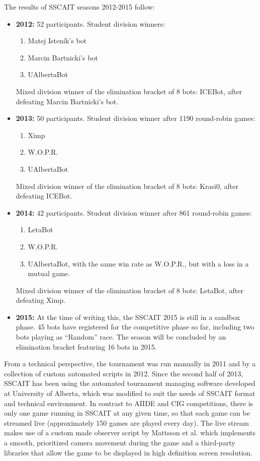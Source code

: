 \documentclass{llncs}
\begin{document}
The results of SSCAIT seasons 2012-2015 follow:
\begin{itemize}
  \item {\bf 2012:} 52 participants. Student division winners: 
  	\begin{enumerate}
  	  \item Matej Isten\'{i}k's bot
  	  \item Marcin Bartnicki's bot
  	  \item UAlbertaBot
  	\end{enumerate}
  Mixed division winner of the elimination bracket of 8 bots: ICEBot, after defeating Marcin Bartnicki's bot. 
  \item {\bf 2013:} 50 participants. Student division winner after 1190 round-robin games: 
    \begin{enumerate}
  	  \item Ximp
  	  \item W.O.P.R.
  	  \item UAlbertaBot
  	\end{enumerate}
  Mixed division winner of the elimination bracket of 8 bots: Krasi0, after defeating ICEBot.
  \item {\bf 2014:} 42 participants. Student division winner after 861 round-robin games: 
    \begin{enumerate}
  	  \item LetaBot
  	  \item W.O.P.R.
  	  \item UAlbertaBot, with the same win rate as W.O.P.R., but with a loss in a mutual game.
  	\end{enumerate}
  Mixed division winner of the elimination bracket of 8 bots: LetaBot, after defeating Ximp.
  \item {\bf 2015:} At the time of writing this, the SSCAIT 2015 is still in a sandbox phase. 45 bots have registered for the competitive phase so far, including two bots playing as ``Random'' race. The season will be concluded by an elimination bracket featuring 16 bots in 2015.
\end{itemize}


From a technical perspective, the tournament was run manually in 2011 and by a collection of custom automated scripts in 2012. Since the second half of 2013, SSCAIT has been using the automated tournament managing software developed at University of Alberta, which was modified to suit the needs of SSCAIT format and technical environment. In contrast to AIIDE and CIG competitions, there is only one game running in SSCAIT at any given time, so that each game can be streamed live (approximately 150 games are played every day). The live stream makes use of a custom made observer script by Mattsson et al. \cite{mattsson2015automatic} which implements a smooth, prioritized camera movement during the game and a third-party libraries that allow the game to be displayed in high definition screen resolution. 
\end{document}
